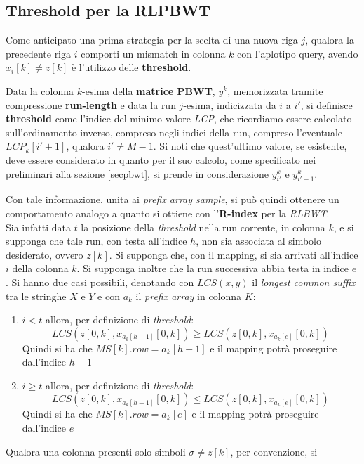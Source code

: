 \subsection{Threshold per la RLPBWT}
Come anticipato una prima strategia per la scelta di una nuova riga $j$, qualora
la precedente riga $i$ comporti un mismatch in colonna $k$ con l'aplotipo query,
avendo $x_i[k]\neq z[k]$ è l'utilizzo delle \textbf{threshold}.
\begin{definizione}
  Data la colonna $k$-esima della \textbf{matrice PBWT}, $y^k$, memorizzata
  tramite compressione \textbf{run-length} e data la run $j$-esima, indicizzata
  da $i$ a $i'$, si definisce \textbf{threshold} come l'indice del minimo valore
  \textit{LCP}, che ricordiamo essere calcolato sull'ordinamento inverso,
  compreso negli indici della run, compreso l'eventuale 
  $LCP_k[i'+1]$, qualora $i'\neq M-1$. Si noti che quest'ultimo valore, se
  esistente, deve essere considerato in quanto per il suo calcolo, come
  specificato nei preliminari alla sezione \ref{secpbwt}, si prende in
  considerazione $y^k_{i'}$ e $y^k_{i'+1}$.
\end{definizione}
Con tale informazione, unita ai \textit{prefix array sample}, si può quindi
ottenere un comportamento analogo a quanto si ottiene con l'\textbf{R-index} per
la \textit{RLBWT}.\\
Sia infatti data $t$ la posizione della \textit{threshold} nella run corrente,
in colonna $k$, e
si supponga che tale run, con testa all'indice $h$, non sia associata al simbolo
desiderato, ovvero $z[k]$. Si supponga che, con il mapping, si sia arrivati
all'indice $i$ della colonna $k$. Si supponga inoltre che la run successiva
abbia testa in indice $e$. Si hanno due casi possibili, denotando con
$LCS(x,y)$ il \textit{longest common suffix} tra le stringhe $X$ e $Y$ e con
$a_k$ il \textit{prefix array} in colonna $K$:
\begin{enumerate}
  \item $i<t$ allora, per definizione di \textit{threshold}:
  \[LCS(z[0,k], x_{a_{k}[h-1]}[0,k])\geq LCS(z[0,k], x_{a_{k}[e]}[0,k])\]
  Quindi si ha che $MS[k].row=a_{k}[h-1]$ e il mapping potrà proseguire
  dall'indice $h-1$
  \item  $i\geq t$ allora, per definizione di \textit{threshold}:
  \[LCS(z[0,k], x_{a_{k}[h-1]}[0,k])\leq LCS(z[0,k], x_{a_{k}[e]}[0,k])\]
  Quindi si ha che $MS[k].row=a_{k}[e]$ e il mapping potrà proseguire
  dall'indice $e$
\end{enumerate}
Qualora una colonna presenti solo simboli $\sigma\neq z[k]$, per convenzione, si
